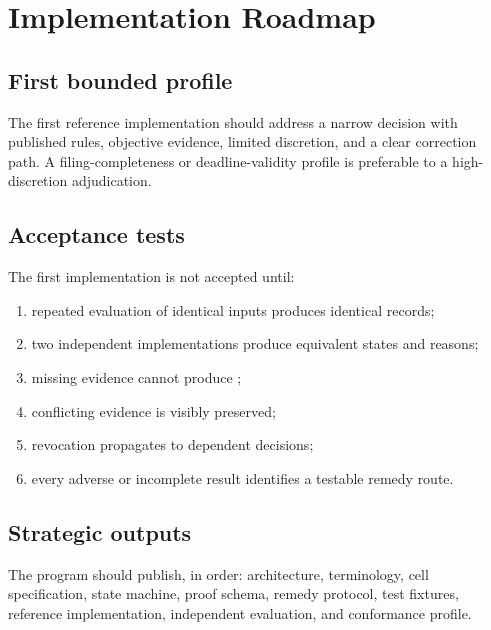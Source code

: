 \chapter{Implementation Roadmap}
\section{First bounded profile}
The first reference implementation should address a narrow decision with published rules, objective evidence, limited discretion, and a clear correction path. A filing-completeness or deadline-validity profile is preferable to a high-discretion adjudication.

\section{Acceptance tests}
The first implementation is not accepted until:
\begin{enumerate}
\item repeated evaluation of identical inputs produces identical records;
\item two independent implementations produce equivalent states and reasons;
\item missing evidence cannot produce ;
\item conflicting evidence is visibly preserved;
\item revocation propagates to dependent decisions;
\item every adverse or incomplete result identifies a testable remedy route.
\end{enumerate}

\section{Strategic outputs}
The program should publish, in order: architecture, terminology, cell specification, state machine, proof schema, remedy protocol, test fixtures, reference implementation, independent evaluation, and conformance profile.

